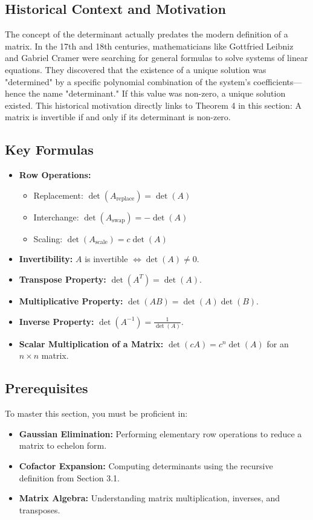 \documentclass{article}
\begin{document}
\subsection{Historical Context and Motivation}
The concept of the determinant actually predates the modern definition of a matrix. In the 17th and 18th centuries, mathematicians like Gottfried Leibniz and Gabriel Cramer were searching for general formulas to solve systems of linear equations. They discovered that the existence of a unique solution was "determined" by a specific polynomial combination of the system's coefficients—hence the name "determinant." If this value was non-zero, a unique solution existed. This historical motivation directly links to Theorem 4 in this section: A matrix is invertible if and only if its determinant is non-zero.

\subsection{Key Formulas}
\begin{itemize}
    \item \textbf{Row Operations:} 
    \begin{itemize}
        \item Replacement: $\det(A_{\text{replace}}) = \det(A)$
        \item Interchange: $\det(A_{\text{swap}}) = -\det(A)$
        \item Scaling: $\det(A_{\text{scale}}) = c \det(A)$
    \end{itemize}
    \item \textbf{Invertibility:} $A$ is invertible $\iff \det(A) \neq 0$.
    \item \textbf{Transpose Property:} $\det(A^T) = \det(A)$.
    \item \textbf{Multiplicative Property:} $\det(AB) = \det(A)\det(B)$.
    \item \textbf{Inverse Property:} $\det(A^{-1}) = \frac{1}{\det(A)}$.
    \item \textbf{Scalar Multiplication of a Matrix:} $\det(cA) = c^n \det(A)$ for an $n \times n$ matrix.
\end{itemize}

\subsection{Prerequisites}
To master this section, you must be proficient in:
\begin{itemize}
    \item \textbf{Gaussian Elimination:} Performing elementary row operations to reduce a matrix to echelon form.
    \item \textbf{Cofactor Expansion:} Computing determinants using the recursive definition from Section 3.1.
    \item \textbf{Matrix Algebra:} Understanding matrix multiplication, inverses, and transposes.
\end{itemize}
\end{document}
